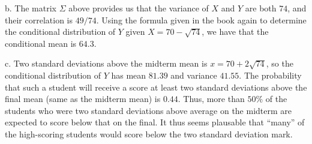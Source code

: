 \documentclass{article}
\begin{document}
b. The matrix $\Sigma$ above provides us that the variance of $X$ and $Y$ are both $74$, and their correlation is $49/74$. Using the formula given in the book again to determine the conditional distribution of $Y$ given $X=70-\sqrt{74}$, we have that the conditional mean is $64.3$.

c. Two standard deviations above the midterm mean is $x=70+2\sqrt{74}$, so the conditional distribution of $Y$ has mean $81.39$ and variance $41.55$. The probability that such a student will receive a score at least two standard deviations above the final mean (same as the midterm mean) is $0.44$. Thus, more than $50\%$ of the students who were two standard deviations above average on the midterm are expected to score below that on the final. It thus seems plausable that ``many'' of the high-scoring students would score below the two standard deviation mark.
\end{document}
